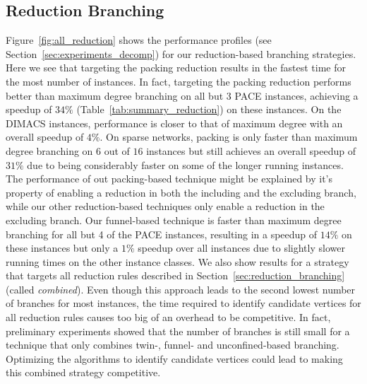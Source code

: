 \documentclass[a4paper,UKenglish,cleveref, autoref, thm-restate]{lipics-v2021}
\begin{document}
\subsection{Reduction Branching}
Figure~\ref{fig:all_reduction} shows the performance profiles (see
Section~\ref{sec:experiments_decomp}) for our reduction-based branching strategies. Here we see that targeting the packing reduction
results in the fastest time for the most number of instances. In fact, targeting
the packing reduction performs better than maximum degree branching on all but 3
PACE instances, achieving a speedup of $34\%$ (Table~\ref{tab:summary_reduction}) on these instances. On the DIMACS
instances, performance is closer to that of maximum degree with an overall
speedup of $4\%$. On sparse networks, packing is only faster than maximum degree
branching on $6$ out of $16$ instances but still achieves an overall speedup of
$31\%$ due to being considerably faster on some of the longer running instances.
The performance of out packing-based technique might be explained by it's
property of enabling a reduction in both the including and the excluding branch,
while our other reduction-based techniques only enable a reduction in the
excluding branch.
Our funnel-based technique is faster than maximum degree branching for all but 4
of the PACE instances, resulting in a speedup of $14\%$ on these instances but
only a $1\%$ speedup over all instances due to slightly slower running times on
the other instance classes. We also show results for a strategy that targets all reduction rules
described in Section~\ref{sec:reduction_branching} (called \emph{combined}). Even though this approach
leads to the second lowest number of branches for most instances, the time required to
identify candidate vertices for all reduction rules causes too big of an
overhead to be competitive. In fact, preliminary experiments showed that the
number of branches is still small for a technique that only combines twin-,
funnel- and unconfined-based branching. Optimizing the algorithms to identify candidate
vertices could lead to making this combined strategy
competitive.


\end{document}
